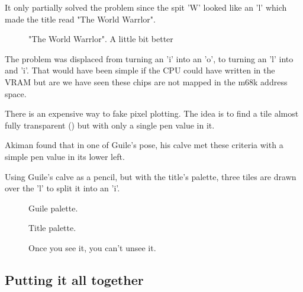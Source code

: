 It only partially solved the problem since the spit 'W' looked like an 'l' which made the title read "The World Warrlor". 

\begin{figure}[H]
 \caption*{"The World Warrlor". A little bit better}%
 \end{figure}%


The problem was displaced from turning an 'i' into an 'o', to turning an 'l' into and 'i'. That would have been simple if the CPU could have written in the VRAM but are we have seen these chips are not mapped in the m68k address space.

There is an expensive way to fake pixel plotting. The idea is to find a tile almost fully transparent () but with only a single pen value in it. 

Akiman found that in one of Guile's pose, his calve met these criteria with a simple pen value in its lower left.



\pagebreak

Using Guile's calve as a pencil, but with the title's palette, three tiles are drawn over the 'l' to split it into an 'i'.

\begin{figure}[H]
 \caption*{Guile palette.}%
 \end{figure}%

 \begin{figure}[H]
 \caption*{Title palette.}%
 \end{figure}%



\begin{figure}[H]
 \caption*{Once you see it, you can't unsee it.}%
 \end{figure}%



\subsection{Putting it all together}

